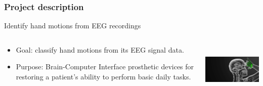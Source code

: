 \documentclass{beamer}
\begin{document}
\begin{frame}
\frametitle{Project description}
Identify hand motions from EEG recordings
\begin{columns}[T]
\begin{column}{.5\textwidth}
\begin{itemize} 
\item Goal: classify hand motions from its EEG signal data.  
\item Purpose: Brain-Computer Interface prosthetic devices for restoring a patient's ability to perform basic daily tasks. 
\end{itemize}
\end{column}
\begin{column}{.5\textwidth}
\begin{center}
\includegraphics[height=1.0in]{front_page.png}
\end{center}
\end{column}
\end{columns}
  \end{frame}
\end{document}
